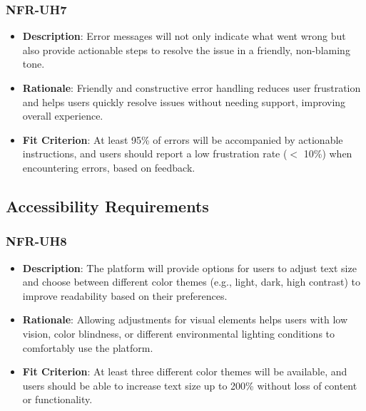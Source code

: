 \documentclass[12pt]{article}
\begin{document}
        \subsubsection*{NFR-UH7} 
        \label{sec:UH7}
        \begin{itemize} 
            \item \textbf{Description}: Error messages will not only indicate what went wrong but also provide actionable steps to resolve the issue in a friendly, non-blaming tone.  
            \item \textbf{Rationale}: Friendly and constructive error handling reduces user frustration and helps users quickly resolve issues without needing support, improving overall experience.  
            \item \textbf{Fit Criterion}: At least 95\% of errors will be accompanied by actionable instructions, and users should report a low frustration rate ($<$ 10\%) when encountering errors, based on feedback.
        \end{itemize}


\subsection{Accessibility Requirements}


\subsubsection*{NFR-UH8} 
\label{sec:UH8}
        \begin{itemize} 
            \item \textbf{Description}: The platform will provide options for users to adjust text size and choose between different color themes (e.g., light, dark, high contrast) to improve readability based on their preferences.  
            \item \textbf{Rationale}: Allowing adjustments for visual elements helps users with low vision, color blindness, or different environmental lighting conditions to comfortably use the platform.  
            \item \textbf{Fit Criterion}: At least three different color themes will be available, and users should be able to increase text size up to 200\% without loss of content or functionality.
        \end{itemize}
\end{document}
